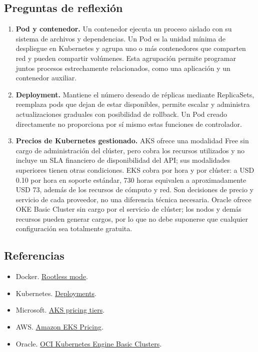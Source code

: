 \subsection{Preguntas de reflexión}
\begin{enumerate}
\item \textbf{Pod y contenedor.} Un contenedor ejecuta un proceso aislado con su sistema de archivos y dependencias. Un Pod es la unidad mínima de despliegue en Kubernetes y agrupa uno o más contenedores que comparten red y pueden compartir volúmenes. Esta agrupación permite programar juntos procesos estrechamente relacionados, como una aplicación y un contenedor auxiliar.
\item \textbf{Deployment.} Mantiene el número deseado de réplicas mediante ReplicaSets, reemplaza pods que dejan de estar disponibles, permite escalar y administra actualizaciones graduales con posibilidad de rollback. Un Pod creado directamente no proporciona por sí mismo estas funciones de controlador.
\item \textbf{Precios de Kubernetes gestionado.} AKS ofrece una modalidad Free sin cargo de administración del clúster, pero cobra los recursos utilizados y no incluye un SLA financiero de disponibilidad del API; sus modalidades superiores tienen otras condiciones. EKS cobra por hora y por clúster: a USD 0.10 por hora en soporte estándar, 730 horas equivalen a aproximadamente USD 73, además de los recursos de cómputo y red. Son decisiones de precio y servicio de cada proveedor, no una diferencia técnica necesaria. Oracle ofrece OKE Basic Cluster sin cargo por el servicio de clúster; los nodos y demás recursos pueden generar cargos, por lo que no debe suponerse que cualquier configuración sea totalmente gratuita.
\end{enumerate}

\subsection{Referencias}
\begin{itemize}
\item Docker. \href{https://docs.docker.com/engine/security/rootless/}{Rootless mode}.
\item Kubernetes. \href{https://kubernetes.io/docs/concepts/workloads/controllers/deployment/}{Deployments}.
\item Microsoft. \href{https://learn.microsoft.com/azure/aks/free-standard-pricing-tiers}{AKS pricing tiers}.
\item AWS. \href{https://aws.amazon.com/eks/pricing/}{Amazon EKS Pricing}.
\item Oracle. \href{https://www.oracle.com/apac/cloud/iaas-paas/}{OCI Kubernetes Engine Basic Clusters}.
\end{itemize}

